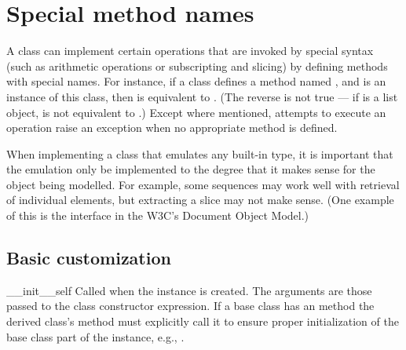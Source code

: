 \section{Special method names\label{specialnames}}

A class can implement certain operations that are invoked by special
syntax (such as arithmetic operations or subscripting and slicing) by
defining methods with special names.  For instance, if a class defines
a method named , and  is an instance of
this class, then  is equivalent to
.  (The reverse is not true --- if  is
a list object,  is not equivalent to
.)  Except where mentioned, attempts to execute an
operation raise an exception when no appropriate method is defined.

When implementing a class that emulates any built-in type, it is
important that the emulation only be implemented to the degree that it
makes sense for the object being modelled.  For example, some
sequences may work well with retrieval of individual elements, but
extracting a slice may not make sense.  (One example of this is the
 interface in the W3C's Document Object Model.)


\subsection{Basic customization\label{customization}}

\begin{methoddesc}[object]{__init__}{self}
Called when the instance is created.  The arguments are those passed
to the class constructor expression.  If a base class has an
 method the derived class's  method must
explicitly call it to ensure proper initialization of the base class
part of the instance, e.g., .
\end{methoddesc}


